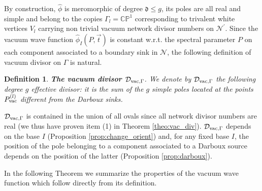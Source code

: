 \documentclass[11pt]{amsart}
\theoremstyle{plain}
\numberwithin{equation}{section}
\newtheorem{definition}{Definition}[subsection]
\def \DVG {{\mathcal D}_{\textup{\scriptsize vac},\Gamma}}
\begin{document}
By construction, $\hat \phi$ is meromorphic of degree $\mathfrak d\le g$, its poles are all real and simple and belong to the copies $\Gamma_l=\mathbb{CP}^1$ corresponding to trivalent white vertices $V_l$ carrying non trivial vacuum network divisor numbers on ${\mathcal N}^{\prime}$. 
Since the vacuum wave function  $\hat \phi_I (P,\vec t)$ is constant w.r.t. the spectral parameter $P$ on each component associated to a boundary sink in $\mathcal N$, the following definition of vacuum divisor on $\Gamma$ is natural.

\begin{definition}\label{def:vac_div_G}{\textbf{The vacuum divisor $\DVG$}}. We denote by $\DVG$ the following degree $g$ effective divisor: it is the sum of the $g$ simple poles located at the points 
$P_{\textup{\scriptsize vac}}^{(l)}$ different from the Darboux sinks. 
\end{definition}

$\DVG$ is contained in the union of all ovals since all network divisor numbers are real (we thus have proven item (1) in Theorem \ref{theo:vac_div}).
$\DVG$ depends on the base $I$ (Proposition \ref{prop:change_orient}) and, for any fixed base $I$, the position of the pole belonging to a component associated to a Darboux source depends on the position of the latter (Proposition \ref{prop:darboux}).

In the following Theorem we summarize the properties 
of the vacuum wave function which follow directly from its definition. 
\end{document}
